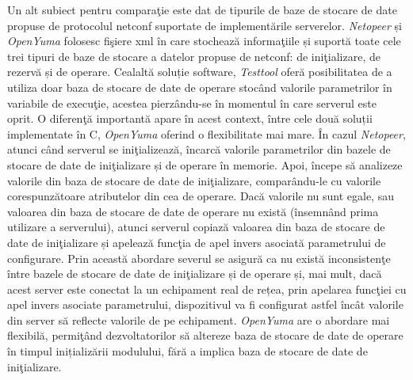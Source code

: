 Un alt subiect pentru comparaţie este dat de tipurile de baze de stocare de date propuse de protocolul \gls{netconf} suportate de implementările serverelor. \textit{Netopeer} și \textit{OpenYuma} folosesc fişiere \gls{xml} în care stochează informaţiile și suportă toate cele trei tipuri de baze de stocare a datelor propuse de \gls{netconf}: de iniţializare, de rezervă și de operare. Cealaltă soluție software, \textit{Testtool} oferă posibilitatea de a utiliza doar baza de stocare de date de operare stocând valorile parametrilor în variabile de execuţie, acestea pierzându-se în momentul în care serverul este oprit. O diferenţă importantă apare în acest context, între cele două soluții implementate în C, \textit{OpenYuma} oferind o flexibilitate mai mare. În cazul \textit{Netopeer}, atunci când serverul se iniţializează, încarcă valorile parametrilor din bazele de stocare de date de iniţializare și de operare în memorie. Apoi, începe să analizeze valorile din baza de stocare de date de iniţializare, comparându-le cu valorile corespunzătoare atributelor din cea de operare. Dacă valorile nu sunt egale, sau valoarea din baza de stocare de date de operare nu există (însemnând prima utilizare a serverului), atunci serverul copiază valoarea din baza de stocare de date de iniţializare și apelează funcţia de apel invers asociată parametrului de configurare. Prin această abordare severul se asigură ca nu există inconsistenţe între bazele de stocare de date de iniţializare și de operare și, mai mult, dacă acest server este conectat la un echipament real de rețea, prin apelarea funcţiei cu apel invers asociate parametrului, dispozitivul va fi configurat astfel încât valorile din server să reflecte valorile de pe echipament. \textit{OpenYuma} are o abordare mai flexibilă, permiţând dezvoltatorilor să altereze baza de stocare de date de operare în timpul inițializării modulului, fără a implica baza de stocare de date de iniţializare.

